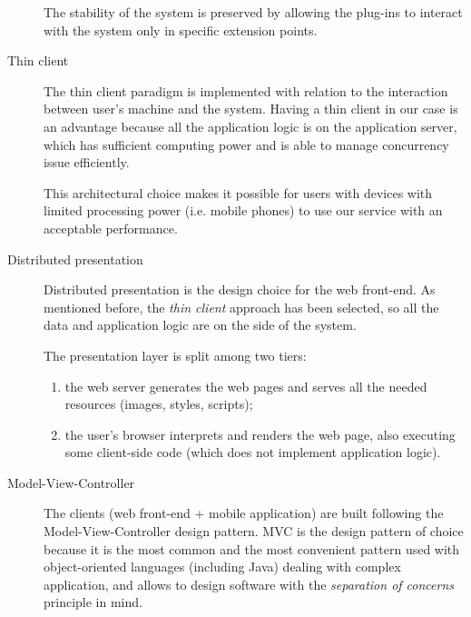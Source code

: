 \begin{description}
The stability of the system is preserved by allowing the plug-ins to interact with the system only in specific extension points.

\item[Thin client] The thin client paradigm is implemented with relation to the interaction between user's machine and the system.
Having a thin client in our case is an advantage because all the application logic is on the application server, which has sufficient computing power and is able to manage concurrency issue efficiently.

This architectural choice makes it possible for users with devices with limited processing power (i.e. mobile phones) to use our service with an acceptable performance.

\item[Distributed presentation]
Distributed presentation is the design choice for the web front-end.
As mentioned before, the \emph{thin client} approach has been selected, so all the data and application logic are on the side of the system.

The presentation layer is split among two tiers:
\begin{enumerate}
    \item the web server generates the web pages and serves all the needed resources (images, styles, scripts);
    \item the user's browser interprets and renders the web page, also executing some client-side code (which does not implement application logic).
\end{enumerate}

\item[Model-View-Controller]
The clients (web front-end + mobile application) are built following the Model-View-Controller design pattern.
MVC is the design pattern of choice because it is the most common and the most convenient pattern used with object-oriented languages (including Java) dealing with complex application, and allows to design software with the \emph{separation of concerns} principle in mind.
\end{description}
